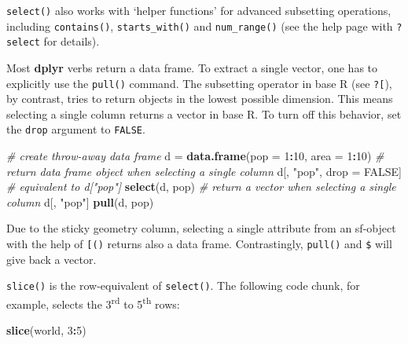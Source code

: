 \documentclass[]{krantz}
\newenvironment{Shaded}{\begin{snugshade}}{\end{snugshade}}
\newcommand{\CommentTok}[1]{\textcolor[rgb]{0.37,0.37,0.37}{\textit{#1}}}
\newcommand{\DataTypeTok}[1]{\textcolor[rgb]{0.27,0.27,0.27}{#1}}
\newcommand{\DecValTok}[1]{\textcolor[rgb]{0.06,0.06,0.06}{#1}}
\newcommand{\KeywordTok}[1]{\textcolor[rgb]{0.27,0.27,0.27}{\textbf{#1}}}
\newcommand{\NormalTok}[1]{#1}
\newcommand{\OperatorTok}[1]{\textcolor[rgb]{0.43,0.43,0.43}{\textbf{#1}}}
\newcommand{\OtherTok}[1]{\textcolor[rgb]{0.37,0.37,0.37}{#1}}
\newcommand{\StringTok}[1]{\textcolor[rgb]{0.5,0.5,0.5}{#1}}
\begin{document}
\texttt{select()} also works with `helper functions' for advanced subsetting operations, including \texttt{contains()}, \texttt{starts\_with()} and \texttt{num\_range()} (see the help page with \texttt{?select} for details).

Most \textbf{dplyr} verbs return a data frame.
To extract a single vector, one has to explicitly use the \texttt{pull()} command.
The subsetting operator in base R (see \texttt{?{[}}), by contrast, tries to return objects in the lowest possible dimension.
This means selecting a single column returns a vector in base R.
To turn off this behavior, set the \texttt{drop} argument to \texttt{FALSE}.

\begin{Shaded}
\begin{Highlighting}[]
\CommentTok{# create throw-away data frame}
\NormalTok{d =}\StringTok{ }\KeywordTok{data.frame}\NormalTok{(}\DataTypeTok{pop =} \DecValTok{1}\OperatorTok{:}\DecValTok{10}\NormalTok{, }\DataTypeTok{area =} \DecValTok{1}\OperatorTok{:}\DecValTok{10}\NormalTok{)}
\CommentTok{# return data frame object when selecting a single column}
\NormalTok{d[, }\StringTok{"pop"}\NormalTok{, drop =}\StringTok{ }\OtherTok{FALSE}\NormalTok{] }\CommentTok{# equivalent to d["pop"]}
\KeywordTok{select}\NormalTok{(d, pop)}
\CommentTok{# return a vector when selecting a single column}
\NormalTok{d[, }\StringTok{"pop"}\NormalTok{]}
\KeywordTok{pull}\NormalTok{(d, pop)}
\end{Highlighting}
\end{Shaded}

Due to the sticky geometry column, selecting a single attribute from an sf-object with the help of \texttt{{[}()} returns also a data frame.
Contrastingly, \texttt{pull()} and \texttt{\$} will give back a vector.

\begin{Shaded}
\end{Shaded}

\texttt{slice()} is the row-equivalent of \texttt{select()}.
The following code chunk, for example, selects the 3\textsuperscript{rd} to 5\textsuperscript{th} rows:

\begin{Shaded}
\begin{Highlighting}[]
\KeywordTok{slice}\NormalTok{(world, }\DecValTok{3}\OperatorTok{:}\DecValTok{5}\NormalTok{)}
\end{Highlighting}
\end{Shaded}
\end{document}
